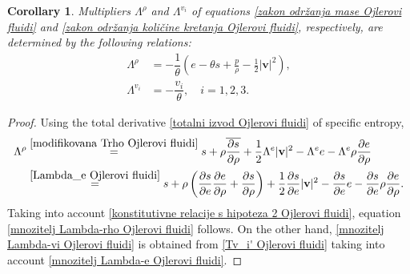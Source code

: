 \documentclass[a4paper,fleqn]{cas-sc}
\newtheorem{corollary}{Corollary}[section]
\theoremstyle{definition}
\begin{document}
\begin{corollary} \label{Cor:Mnozitelji Ojlerovi fluidi}
	Multipliers $\Lambda^{\rho}$ and $\Lambda^{v_i}$ of equations \eqref{zakon održanja mase Ojlerovi fluidi} and \eqref{zakon održanja količine kretanja Ojlerovi fluidi}, respectively, are determined by the following relations: 
	\begin{align} 
		\label{mnozitelj Lambda-rho Ojlerovi fluidi}
		\Lambda^{\rho} & = - \dfrac{1}{\theta} \left( e - \theta s + \frac{p}{\rho} 
		- \frac{1}{2} |\mathbf{v}|^{2} \right), 
		\\
		\label{mnozitelj Lambda-vi Ojlerovi fluidi}
		\Lambda^{v_i} & = - \dfrac{v_{i}}{\theta}, \quad i = 1, 2, 3.
	\end{align}
\end{corollary}
\begin{proof}
	Using the total derivative \eqref{totalni izvod Ojlerovi fluidi} of specific entropy, 
	\begin{align*}
		\Lambda^\rho &\overset{\eqref{modifikovana Trho Ojlerovi fluidi}}{=} s + \rho\overline{\dfrac{\partial s}{\partial\rho}} 
		+ \dfrac{1}{2}\Lambda^e|\mathbf{v}|^2 - \Lambda^ e e 
		- \Lambda^e \rho \dfrac{\partial e}{\partial\rho} 
		\\
		&\overset{\eqref{Lambda_e Ojlerovi fluidi}}{=} s + \rho\left(\dfrac{\partial s}{\partial e}\dfrac{\partial e}{\partial\rho}+\dfrac{\partial s}{\partial\rho}\right)+\dfrac{1}{2}\dfrac{\partial s}{\partial e}|\mathbf{v}|^2 -\dfrac{\partial s}{\partial e} e - \dfrac{\partial s}{\partial e} \rho \dfrac{\partial e}{\partial\rho}.	   
	\end{align*}
	Taking into account \eqref{konstitutivne relacije s hipoteza 2 Ojlerovi fluidi}, equation \eqref{mnozitelj Lambda-rho Ojlerovi fluidi} follows. On the other hand, \eqref{mnozitelj Lambda-vi Ojlerovi fluidi} is obtained from \eqref{Tv_i' Ojlerovi fluidi} taking into account \eqref{mnozitelj Lambda-e Ojlerovi fluidi}. 
\end{proof} 
\end{document}
